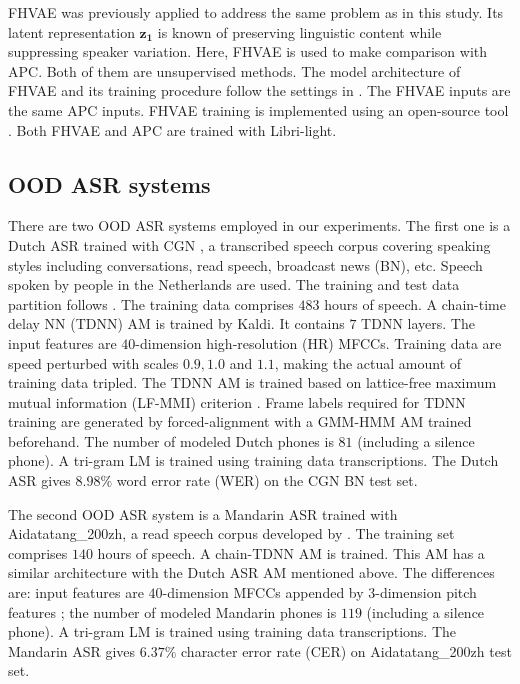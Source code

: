 \documentclass[a4paper]{article}
\begin{document}
FHVAE was previously applied \cite{Feng2019improving} to address the same problem as in this study. Its latent representation $\bm{z_1}$ is known of preserving linguistic content while suppressing speaker variation. Here, FHVAE is used to make comparison with APC. Both of them are unsupervised methods. The model architecture of FHVAE and its training procedure follow the settings in \cite{Feng2019improving}.
The FHVAE inputs  are  the same APC inputs. FHVAE training is implemented using an open-source tool \cite{hsu2017nips}. Both FHVAE and APC are trained with Libri-light. 
\subsection{OOD ASR systems}
There are two OOD ASR systems employed in our experiments. The first one is a Dutch ASR trained with CGN \cite{oostdijk2000spoken}, a transcribed speech corpus covering  speaking styles including conversations, read speech, broadcast news (BN), etc.
Speech spoken by people in the Netherlands are used. The training and test data partition follows \cite{laurensw75cgn_kaldi}. The training data comprises $483$
 hours of speech. A chain-time delay NN (TDNN) AM \cite{povey2016purely} is trained by Kaldi. It contains $7$ TDNN layers. The input features are $40$-dimension high-resolution (HR) MFCCs. Training data are speed perturbed with scales $0.9, 1.0$ and $1.1$, making the actual  amount of training data tripled. The TDNN AM is trained based on lattice-free maximum mutual information (LF-MMI) criterion \cite{povey2016purely}. Frame labels required for TDNN training are generated by forced-alignment with a GMM-HMM AM trained beforehand. The number of modeled Dutch phones is $81$ (including a silence phone).
 A tri-gram LM is trained using training data transcriptions. 
The Dutch ASR gives $8.98\%$ word error rate (WER) on the CGN BN test set.

The second OOD ASR system is a Mandarin ASR trained with Aidatatang\_200zh, a read speech corpus developed by \cite{aidatatang}. The training set comprises $140$ hours of speech. A chain-TDNN AM is trained. This AM has a similar architecture with the Dutch ASR AM mentioned above. The differences are: input features are $40$-dimension MFCCs appended by $3$-dimension pitch features \cite{ghahremani2014pitch}; the number of modeled Mandarin phones is $119$ (including a silence phone). 
A tri-gram LM is trained using training data transcriptions.
The Mandarin ASR gives $6.37\%$ character error rate (CER) on Aidatatang\_200zh test set.
\end{document}
